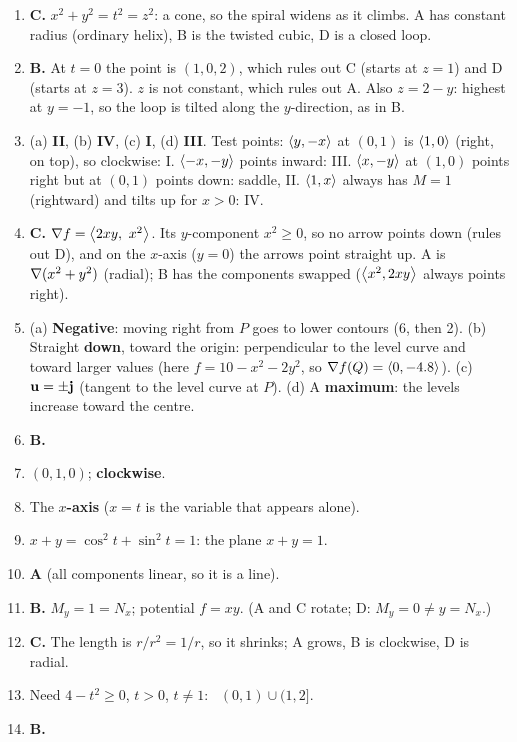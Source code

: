 \begin{enumerate}[label=\textbf{\arabic*.}]
\item \textbf{C.} $x^2+y^2=t^2=z^2$: a cone, so the spiral widens as it climbs. A has constant
  radius (ordinary helix), B is the twisted cubic, D is a closed loop.
\item \textbf{B.} At $t=0$ the point is $(1,0,2)$, which rules out C (starts at $z=1$) and D
  (starts at $z=3$). $z$ is not constant, which rules out A. Also $z=2-y$: highest at $y=-1$, so the
  loop is tilted along the $y$-direction, as in B.
\item (a) \textbf{II}, (b) \textbf{IV}, (c) \textbf{I}, (d) \textbf{III}.
  Test points: $\left\langle y,-x \right\rangle$ at $(0,1)$ is $\left\langle 1,0 \right\rangle$ (right, on top), so clockwise: I.
  $\left\langle -x,-y \right\rangle$ points inward: III. $\left\langle x,-y \right\rangle$ at $(1,0)$ points right but at $(0,1)$ points
  down: saddle, II. $\left\langle 1,x \right\rangle$ always has $M=1$ (rightward) and tilts up for $x>0$: IV.
\item \textbf{C.} $\grad f=\ip{2xy,\ x^2}$. Its $y$-component $x^2\ge0$, so no arrow points
  down (rules out D), and on the $x$-axis ($y=0$) the arrows point straight up. A is
  $\nabla(x^2+y^2)$ (radial); B has the components swapped ($\left\langle x^2,2xy \right\rangle$ always points right).
\item (a) \textbf{Negative}: moving right from $P$ goes to lower contours (6, then 2).
  (b) Straight \textbf{down}, toward the origin: perpendicular to the level curve and toward
  larger values (here $f=10-x^2-2y^2$, so $\nabla f(Q)=\left\langle 0,-4.8 \right\rangle$). (c) $\mathbf{u}=\pm\mathbf{j}$ (tangent
  to the level curve at $P$). (d) A \textbf{maximum}: the levels increase toward the centre.
\item \textbf{B.}
\item $(0,1,0)$; \textbf{clockwise}.
\item The \textbf{$x$-axis} ($x=t$ is the variable that appears alone).
\item $x+y=\cos^2t+\sin^2t=1$: the plane \boldmath$x+y=1$\unboldmath.
\item \textbf{A} (all components linear, so it is a line).
\item \textbf{B.} $M_y=1=N_x$; potential $f=xy$. (A and C rotate; D: $M_y=0\ne y=N_x$.)
\item \textbf{C.} The length is $r/r^2=1/r$, so it shrinks; A grows, B is clockwise, D is radial.
\item Need $4-t^2\ge0$, $t>0$, $t\ne1$: \ \boldmath$(0,1)\cup(1,2]$\unboldmath.
\item \textbf{B.}
\end{enumerate}
